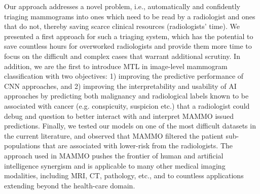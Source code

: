 \documentclass[journal]{IEEEtran}
\begin{document}
Our approach addresses a novel problem, i.e., automatically and confidently triaging mammograms into ones which need to be read by a radiologist and ones that do not, thereby saving scarce clinical resources (radiologists’ time). We presented a first approach for such a triaging system, which has the potential to save countless hours for overworked radiologists and provide them more time to focus on the difficult and complex cases that warrant additional scrutiny. In addition, we are the first to introduce MTL in image-level mammogram classification with two objectives: 1) improving the predictive performance of CNN approaches, and 2) improving the interpretability and usability of AI approaches by predicting both malignancy and radiological labels known to be associated with cancer (e.g. conspicuity, suspicion etc.) that a radiologist could debug and question to better interact with and interpret MAMMO issued predictions.  Finally, we tested our models on one of the most difficult datasets in the current literature, and observed that MAMMO filtered the patient sub-populations that are associated with lower-risk from the radiologists.   
The approach used in MAMMO pushes the frontier of human and artificial intelligence synergism and is applicable to many other medical imaging modalities, including MRI, CT, pathology, etc., and to countless applications extending beyond the health-care domain.
\end{document}
